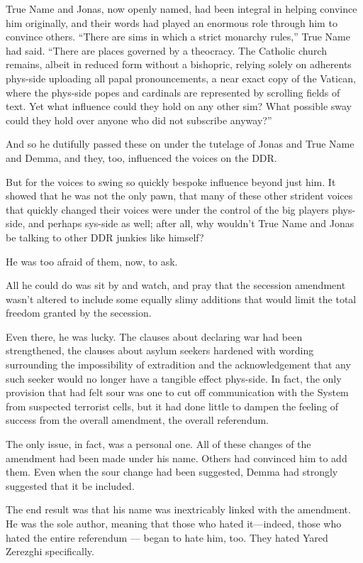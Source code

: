 True Name and Jonas, now openly named, had been integral in helping convince him originally, and their words had played an enormous role through him to convince others. ``There are sims in which a strict monarchy rules,'' True Name had said. ``There are places governed by a theocracy. The Catholic church remains, albeit in reduced form without a bishopric, relying solely on adherents phys-side uploading all papal pronouncements, a near exact copy of the Vatican, where the phys-side popes and cardinals are represented by scrolling fields of text. Yet what influence could they hold on any other sim? What possible sway could they hold over anyone who did not subscribe anyway?''

And so he dutifully passed these on under the tutelage of Jonas and True Name and Demma, and they, too, influenced the voices on the DDR.

But for the voices to swing so quickly bespoke influence beyond just him. It showed that he was not the only pawn, that many of these other strident voices that quickly changed their voices were under the control of the big players phys-side, and perhaps sys-side as well; after all, why wouldn't True Name and Jonas be talking to other DDR junkies like himself?

He was too afraid of them, now, to ask.

All he could do was sit by and watch, and pray that the secession amendment wasn't altered to include some equally slimy additions that would limit the total freedom granted by the secession.

Even there, he was lucky. The clauses about declaring war had been strengthened, the clauses about asylum seekers hardened with wording surrounding the impossibility of extradition and the acknowledgement that any such seeker would no longer have a tangible effect phys-side. In fact, the only provision that had felt sour was one to cut off communication with the System from suspected terrorist cells, but it had done little to dampen the feeling of success from the overall amendment, the overall referendum.

The only issue, in fact, was a personal one. All of these changes of the amendment had been made under his name. Others had convinced him to add them. Even when the sour change had been suggested, Demma had strongly suggested that it be included.

The end result was that his name was inextricably linked with the amendment. He was the sole author, meaning that those who hated it---indeed, those who hated the entire referendum — began to hate him, too. They hated Yared Zerezghi specifically.

